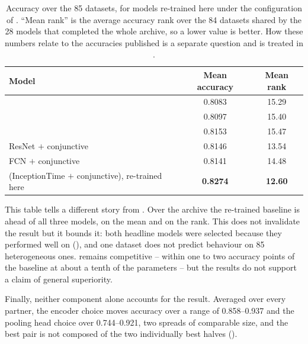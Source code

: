 \begin{table}[tbp]
\caption{Accuracy over the 85 \ucr{} datasets, for models re-trained here under the configuration of
. ``Mean rank'' is the average accuracy rank over the 84 datasets shared by the
28 models that completed the whole archive, so a lower value is better. How these numbers relate to
the accuracies \millet{} published is a separate question and is treated in .}
\label{tab:ucr_accuracy}
\begin{center}
\footnotesize
\begin{tabular}{lcc}
\toprule
\textbf{Model} & \textbf{Mean accuracy} & \textbf{Mean rank} \\
\midrule
\mgat{}                      & 0.8083 & 15.29 \\
\mbot{}                      & 0.8097 & 15.40 \\
\minp{}                      & 0.8153 & 15.47 \\
ResNet $+$ conjunctive       & 0.8146 & 13.54 \\
FCN $+$ conjunctive          & 0.8141 & 14.48 \\
\midrule
\millet{} (InceptionTime $+$ conjunctive), re-trained here & \textbf{0.8274} & \textbf{12.60} \\
\bottomrule
\end{tabular}
\end{center}
\end{table}

This table tells a different story from . Over the \ucr{} archive the re-trained
\millet{} baseline is ahead of all three \seanet{} models, on the mean and on the rank. This does not
invalidate the \webtraffic{} result but it bounds it: both headline models were selected because they
performed well on \webtraffic{} (), and one dataset does not predict behaviour
on 85 heterogeneous ones. \seanet{} remains competitive -- within one to two accuracy points of the
baseline at about a tenth of the parameters -- but the results do not support a claim of general
superiority.

Finally, neither component alone accounts for the result. Averaged over every partner, the encoder
choice moves \webtraffic{} accuracy over a range of 0.858--0.937 and the pooling head choice over
0.744--0.921, two spreads of comparable size, and the best pair is not composed of the two
individually best halves ().
